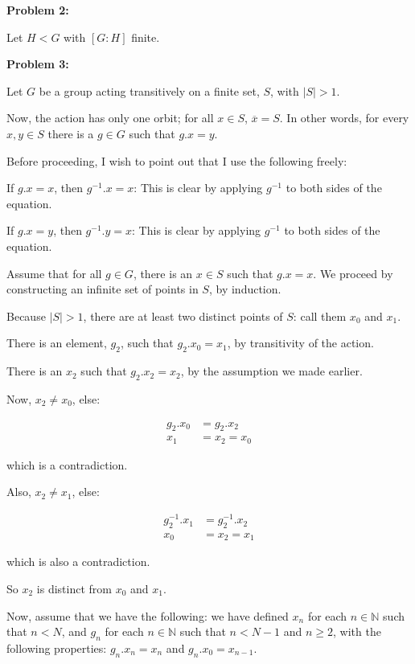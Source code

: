 \documentclass[a4paper,12pt]{article}
\newcommand{\tab}{\hspace{4mm}} %
\newcommand{\shunt}{\vspace{20mm}}
\newcommand{\absval}[1]{\lvert #1 \rvert}
\newcommand{\N}{\mathbb{N}}
\begin{document}
\shunt

{\bf Problem 2:}

Let $H < G$ with $[G:H]$ finite.

\shunt

{\bf Problem 3:}

Let $G$ be a group acting transitively on a finite set, $S$, with $\absval{S} > 1$.

Now, the action has only one orbit; for all $x \in S$, $\overline{x} = S$. In other words, for every $x, y \in S$ there is a $g \in G$ such that $g.x = y$.

Before proceeding, I wish to point out that I use the following freely:

\tab If $g.x = x$, then $g^{-1}.x=x$: This is clear by applying $g^{-1}$ to both sides of the equation.

\tab If $g.x=y$, then $g^{-1}.y=x$: This is clear by applying $g^{-1}$ to both sides of the equation.

Assume that for all $g \in G$, there is an $x \in S$ such that $g.x=x$. We proceed by constructing an infinite set of points in $S$, by induction.

\tab Because $\absval{S} >1$, there are at least two distinct points of $S$: call them $x_0$ and $x_1$.

\tab There is an element, $g_2$, such that $g_2.x_0=x_1$, by transitivity of the action.

\tab There is an $x_2$ such that $g_2.x_2 = x_2$, by the assumption we made earlier.

\tab Now, $x_2 \neq x_0$, else:

\begin{align*}
g_2.x_0 &= g_2.x_2\\
x_1&= x_2=x_0
\end{align*}

\tab which is a contradiction.

\tab Also, $x_2 \neq x_1$, else:

\begin{align*}
g_2^{-1}.x_1 &= g_2^{-1}.x_2\\
x_0&= x_2=x_1
\end{align*} 

\tab which is also a contradiction.

\tab So $x_2$ is distinct from $x_0$ and $x_1$.

\tab Now, assume that we have the following: we have defined $x_n$ for each $n \in \N$ such that $n < N$, and $g_n$ for each $n \in \N$ such that $n < N-1$ and $n \geq 2$, with the following properties: $g_n.x_n = x_n$ and $g_n.x_0 = x_{n-1}$.
\end{document}
